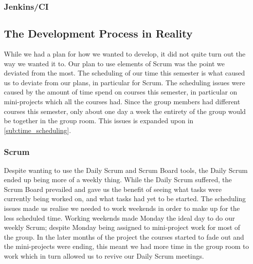 \subsubsection{Jenkins/CI}
\subsection{The Development Process in Reality}
While we had a plan for how we wanted to develop, it did not quite turn out the way we wanted it to.
Our plan to use elements of Scrum was the point we deviated from the most.
The scheduling of our time this semester is what caused us to deviate from our plans, in particular for Scrum.
The scheduling issues were caused by the amount of time spend on courses this semester, in particular on mini-projects which all the courses had.
Since the group members had different courses this semester, only about one day a week the entirety of the group would be together in the group room.
This issues is expanded upon in \cref{sub:time_scheduling}.
\subsubsection{Scrum}
Despite wanting to use the Daily Scrum and Scrum Board tools, the Daily Scrum ended up being more of a weekly thing.
While the Daily Scrum suffered, the Scrum Board prevailed and gave us the benefit of seeing what tasks were currently being worked on, and what tasks had yet to be started.
The scheduling issues made us realise we needed to work weekends in order to make up for the less scheduled time.
Working weekends made Monday the ideal day to do our weekly Scrum; despite Monday being assigned to mini-project work for most of the group.
In the later months of the project the courses started to fade out and the mini-projects were ending, this meant we had more time in the group room to work which in turn allowed us to revive our Daily Scrum meetings.
